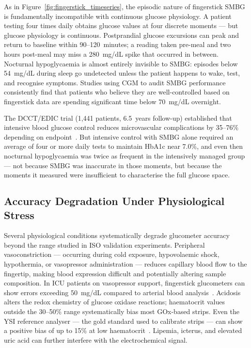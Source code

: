 As in Figure~\ref{fig:fingerstick_timeseries}, the episodic nature of fingerstick SMBG is fundamentally incompatible with continuous glucose physiology. A patient testing four times daily obtains glucose values at four discrete moments --- but glucose physiology is continuous. Postprandial glucose excursions can peak and return to baseline within 90--120~minutes; a reading taken pre-meal and two hours post-meal may miss a 280~mg/dL spike that occurred in between. Nocturnal hypoglycaemia is almost entirely invisible to SMBG: episodes below 54~mg/dL during sleep go undetected unless the patient happens to wake, test, and recognise symptoms. Studies using CGM to audit SMBG performance consistently find that patients who believe they are well-controlled based on fingerstick data are spending significant time below 70~mg/dL overnight.

The DCCT/EDIC trial (1,441 patients, 6.5~years follow-up) established that intensive blood glucose control reduces microvascular complications by 35--76\% depending on endpoint~\cite{dcct1993}. But intensive control with SMBG alone required an average of four or more daily tests to maintain HbA1c near 7.0\%, and even then nocturnal hypoglycaemia was twice as frequent in the intensively managed group --- not because SMBG was inaccurate in those moments, but because the moments it measured were insufficient to characterise the full glucose space.

\subsection*{Accuracy Degradation Under Physiological Stress}

Several physiological conditions systematically degrade glucometer accuracy beyond the range studied in ISO validation experiments. Peripheral vasoconstriction --- occurring during cold exposure, hypovolaemic shock, hypothermia, or vasopressor administration --- reduces capillary blood flow to the fingertip, making blood expression difficult and potentially altering sample composition. In ICU patients on vasopressor support, fingerstick glucometers can show errors exceeding 50~mg/dL compared to arterial blood analysis~\cite{inaccuracy2015}. Acidosis alters the redox chemistry of glucose oxidase reactions; haematocrit values outside the 30--50\% range systematically bias most GOx-based strips. Even the YSI reference analyser --- the gold standard used to calibrate strips --- can show a positive bias of up to 15\% at low haematocrit~\cite{lyon2017hematocrit}. Lipemia, icterus, and elevated uric acid can further interfere with the electrochemical signal.

